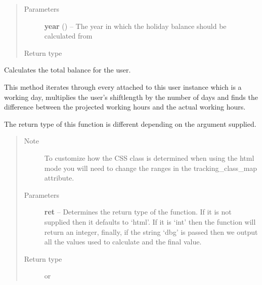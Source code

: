 \documentclass[letterpaper,10pt,english]{sphinxmanual}
\begin{document}
\begin{fulllineitems}
\begin{fulllineitems}
\begin{enumerate}
\end{enumerate}
\begin{quote}\begin{description}
\item[{Parameters}] \leavevmode
\textbf{year} () -- The year in which the holiday balance should be
calculated from

\item[{Return type}] \leavevmode
{}

\end{description}\end{quote}

\end{fulllineitems}


\begin{fulllineitems}
\label{code:timetracker.tracker.models.Tbluser.get_total_balance}
Calculates the total balance for the user.

This method iterates through every {\hyperref[code:timetracker.tracker.models.TrackingEntry]{}} attached to
this user instance which is a working day, multiplies the user's
shiftlength by the number of days and finds the difference between the
projected working hours and the actual working hours.

The return type of this function is different depending on the
argument supplied.
\begin{quote}\begin{description}
\item[{Note }] \leavevmode
To customize how the CSS class is determined when using the
html mode you will need to change the ranges in the
tracking\_class\_map attribute.

\item[{Parameters}] \leavevmode
\textbf{ret} -- Determines the return type of the function. If it is not
supplied then it defaults to `html'. If it is `int' then
the function will return an integer, finally, if the
string `dbg' is passed then we output all the values used
to calculate and the final value.

\item[{Return type}] \leavevmode
{} or 

\end{description}\end{quote}


\end{fulllineitems}
\end{fulllineitems}
\end{document}
